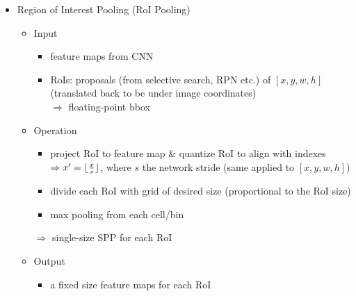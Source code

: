 \begin{itemize}
\item Region of Interest Pooling (RoI Pooling) \label{DL_Layers_Pooling_roi}
	\begin{itemize}
	\item Input
		\begin{itemize}
		\item feature maps from CNN
		\item RoIs: proposals (from selective search, RPN etc.) of $[x,y,w,h]$ \\
		(translated back to be under image coordinates) \\
		$\Rightarrow$ floating-point bbox
		\end{itemize}
	\item Operation
		\begin{itemize}
		\item project RoI to feature map \& quantize RoI to align with indexes \\
		$\Rightarrow x'=\lfloor\frac{x}{s}\rfloor$, where $s$ the network stride (same applied to $[x, y, w, h]$)
		\item divide each RoI with grid of desired size (proportional to the RoI size)
		\item max pooling from each cell/bin
		\end{itemize}
		$\Rightarrow$ single-size SPP for each RoI
	\item Output
		\begin{itemize}
		\item a fixed size feature maps for each RoI
		\end{itemize}
	\end{itemize}
	

\end{itemize}
